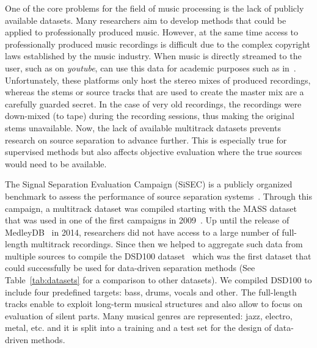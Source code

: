 One of the core problems for the field of music processing is the lack of publicly available datasets.
Many researchers aim to develop methods that could be applied to professionally produced music. 
However, at the same time access to professionally produced music recordings is difficult due to the complex copyright laws established by the music industry.
When music is directly streamed to the user, such as on \emph{youtube}, can use this data for academic purposes such as in~\cite{balke17}.
Unfortunately, these platforms only host the stereo mixes of produced recordings, whereas the stems or source tracks that are used to create the master mix are a carefully guarded secret.
In the case of very old recordings, the recordings were down-mixed (to tape) during the recording sessions, thus making the original stems unavailable.
Now, the lack of available multitrack datasets prevents research on source separation to advance further.
This is especially true for supervised methods but also affects objective evaluation where the true sources would need to be available.
\par
The Signal Separation Evaluation Campaign (SiSEC) is a publicly organized benchmark to assess the performance of source separation systems~\cite{sisec13, ono15, liutkus17, stoeter18sisec}. 
Through this campaign, a multitrack dataset was compiled starting with the MASS dataset~\cite{MTGMASSdb} that was used in one of the first campaigns in 2009~\cite{vincent09}.
Up until the release of MedleyDB~\cite{bittner14} in 2014, researchers did not have access to a large number of full-length multitrack recordings.
Since then we helped to aggregate such data from multiple sources to compile the DSD100 dataset~\cite{liutkus17} which was the first dataset that could successfully be used for data-driven separation methods (See Table~\ref{tab:datasets} for a comparison to other datasets).
We compiled DSD100 to include four predefined targets: bass, drums, vocals and other.
The full-length tracks enable to exploit long-term musical structures and also allow to focus on evaluation of silent parts.
Many musical genres are represented: jazz, electro, metal, etc. and it is split into a training and a test set for the design of data-driven methods.

